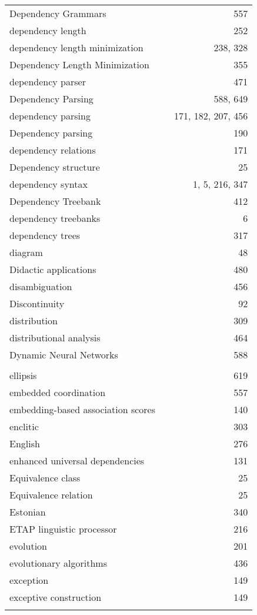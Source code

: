 \documentclass{easychair}
\begin{document}
\begin{longtable}{lp{7em}r}
Dependency Grammars & & 557 
\\
dependency length & & 252 
\\
dependency length minimization & & 238, 328 
\\
Dependency Length Minimization & & 355 
\\
dependency parser & & 471 
\\
Dependency Parsing & & 588, 649 
\\
dependency parsing & & 171, 182, 207, 456 
\\
Dependency parsing & & 190 
\\
dependency relations & & 171 
\\
Dependency structure & & 25 
\\
dependency syntax & & 1, 5, 216, 347 
\\
Dependency Treebank & & 412 
\\
dependency treebanks & & 6 
\\
dependency trees & & 317 
\\
diagram & & 48 
\\
Didactic applications & & 480 
\\
disambiguation & & 456 
\\
Discontinuity & & 92 
\\
distribution & & 309 
\\
distributional analysis & & 464 
\\
Dynamic Neural Networks & & 588 
\\
\\
ellipsis & & 619 
\\
embedded coordination & & 557 
\\
embedding-based association scores & & 140 
\\
enclitic & & 303 
\\
English & & 276 
\\
enhanced universal dependencies & & 131 
\\
Equivalence class & & 25 
\\
Equivalence relation & & 25 
\\
Estonian & & 340 
\\
ETAP linguistic processor & & 216 
\\
evolution & & 201 
\\
evolutionary algorithms & & 436 
\\
exception & & 149 
\\
exceptive construction & & 149 
\\
\\

\end{longtable}
\end{document}
